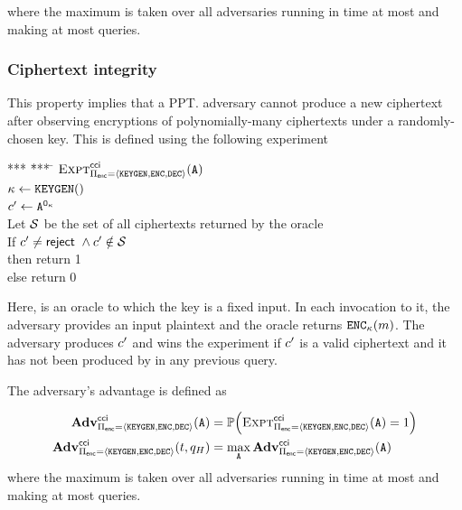 \noindent
where the maximum is taken over all adversaries \indcpaAdversary running
in time at most \timeBound and making at most \oracleQueries queries. 

\subsubsection{Ciphertext integrity}
\label{sec:defn:cipher_integrity}
%
This property implies that a PPT. adversary cannot produce a new ciphertext after observing encryptions of polynomially-many ciphertexts under a randomly-chosen key. This is defined using the following experiment 

\begin{center}
	\begin{minipage}{0.5\columnwidth}
		\begin{tabbing}
			*** \= *** \= \kill
			$\Experiment{\cciLabel}{\encryptionSchemeDefn}(\indcpaAdversary)$ \\
			\> $\genericSymmKey \gets \encryptKeyGen()$ \\
			\> $\ciphertext' \gets 
			\indcpaAdversary^{\cciOracle{\genericSymmKey}}$ \\
            \> Let $\genericSetVar$ be the set of all ciphertexts returned by the oracle \cciOracle{\genericSymmKey} \\
            \> If $\ciphertext' \neq \mathsf{reject} ~\land \ciphertext' \notin \genericSetVar$\\
			\> \> then return 1\\
            \> \> else return 0
		\end{tabbing}
	\end{minipage}
\end{center}

Here, \cciOracle{\genericSymmKey} is an oracle to which the
key \genericSymmKey is a fixed input.  In each invocation to it, the
adversary \indcpaAdversary provides an input plaintext \plaintext and 
the oracle returns $\encrypt[\genericSymmKey](\plaintext)$. The adversary produces $\ciphertext'$
and wins the experiment if $\ciphertext'$ is a valid ciphertext and it has not been produced by \cciOracle{\genericSymmKey} 
in any previous query. 

The adversary's
advantage is defined as

\begin{align*}
	\Advantage{\cciLabel}{\encryptionSchemeDefn}(\indcpaAdversary)
	& = \prob{\Experiment{\cciLabel}{\encryptionSchemeDefn}(\indcpaAdversary) = 1} \\
	\Advantage{\cciLabel}{\encryptionSchemeDefn}(\timeBound, \oracleQueries) 
	&
	= \max_{\indcpaAdversary} \Advantage{\cciLabel}{\encryptionSchemeDefn}(\indcpaAdversary)
\end{align*}
where the maximum is taken over all adversaries \indcpaAdversary running
in time at most \timeBound and making at most \oracleQueries queries.

